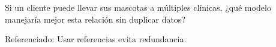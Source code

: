 \documentclass[
    12pt,
    a4paper,
    addpoints,
    answers,
    convocatoria=ext,
    titulacion=NoCD,
    curso=2024/2025,
]{db-exam}
\begin{document}
\begin{questions}
\begin{parts}
\begin{subparts}
\subpart Si un cliente puede llevar sus mascotas a múltiples clínicas, ¿qué modelo manejaría mejor esta relación sin duplicar datos?
\begin{solution}[10em]
Referenciado: Usar referencias evita redundancia.  
\end{solution}

\end{subparts}

\end{parts}

\end{questions}
\end{document}
